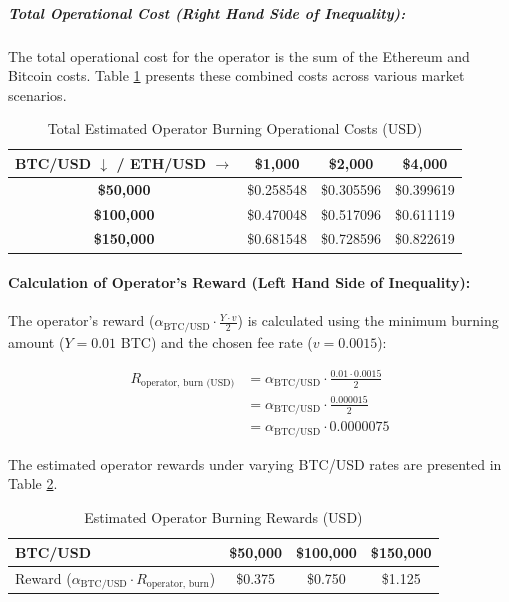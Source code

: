 \documentclass{DESSThesis}
\begin{document}
\subparagraph{Total Operational Cost (Right Hand Side of Inequality):}
The total operational cost for the operator is the sum of the Ethereum and Bitcoin costs. Table \ref{tab:total_burning_cost} presents these combined costs across various market scenarios.

\begin{table}[h!]
\caption{Total Estimated Operator Burning Operational Costs (USD)}
\label{tab:total_burning_cost}
\centering
\begin{tabular}{|c|c|c|c|}
\hline
\textbf{BTC/USD} \(\downarrow\) / \textbf{ETH/USD} \(\rightarrow\) & \textbf{\$1,000} & \textbf{\$2,000} & \textbf{\$4,000} \\
\hline
\textbf{\$50,000} &  \cellcolor{gray!20}\$0.258548 & \$0.305596 & \$0.399619 \\
\hline
\textbf{\$100,000} & \$0.470048 & \cellcolor{gray!20}\$0.517096 & \$0.611119 \\
\hline
\textbf{\$150,000} & \$0.681548 & \$0.728596 & \cellcolor{gray!20}\$0.822619 \\
\hline
\end{tabular}
\end{table}

\paragraph{Calculation of Operator's Reward (Left Hand Side of Inequality):}
The operator's reward (\(\alpha_{\text{BTC/USD}} \cdot \frac{Y \cdot v}{2}\)) is calculated using the minimum burning amount (\(Y = 0.01\) BTC) and the chosen fee rate (\(v = 0.0015\)):

\begin{align*}
R_{\text{operator, burn (USD)}} &= \alpha_{\text{BTC/USD}} \cdot \frac{0.01 \cdot 0.0015}{2} \\
&= \alpha_{\text{BTC/USD}} \cdot \frac{0.000015}{2} \\
&= \alpha_{\text{BTC/USD}} \cdot 0.0000075
\end{align*}

The estimated operator rewards under varying BTC/USD rates are presented in Table \ref{tab:burning_reward_lhs}.

\begin{table}[h!]
\caption{Estimated Operator Burning Rewards (USD)}
\label{tab:burning_reward_lhs}
\centering
\begin{tabular}{|l|c|c|c|}
\hline
\textbf{BTC/USD} & \textbf{\$50,000} & \textbf{\$100,000} & \textbf{\$150,000} \\
\hline
Reward (\(\alpha_{\text{BTC/USD}} \cdot R_{\text{operator, burn}}\)) & \$0.375 & \$0.750 & \$1.125 \\
\hline
\end{tabular}
\end{table}
\end{document}
